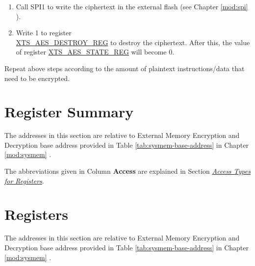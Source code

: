 \documentclass[main\_\_EN.tex]{subfiles}
\begin{document}
\begin{enumerate}
    \item Call SPI1 to write the ciphertext in the external flash (see Chapter \ref{mod:spi} \textit{}).

    \item Write 1 to register\\ \hyperref[regdesc:XTSAESDESTROYREG]{XTS\_AES\_DESTROY\_REG} to destroy the ciphertext. After this, the value of register \hyperref[regdesc:XTSAESSTATEREG]{XTS\_AES\_STATE\_REG} will become 0.

\end{enumerate}

Repeat above steps according to the amount of plaintext instructions/data that need to be encrypted.




\clearpage
\section{Register Summary}
\label{sec:extmemencr-reg-summ}
\hypertarget{extmemencr-reg-summ}{}

The addresses in this section are relative to External Memory Encryption and Decryption base address provided in Table \ref{tab:sysmem-base-address} in Chapter \ref{mod:sysmem} \textit{}.

The abbreviations given in Column \textbf{Access} are explained in Section \hyperref[glossary-access-types]{\textit{Access Types for Registers}}.





\clearpage
\section{Registers}

The addresses in this section are relative to External Memory Encryption and Decryption base address provided in Table \ref{tab:sysmem-base-address} in Chapter \ref{mod:sysmem} \textit{}.


\end{document}
